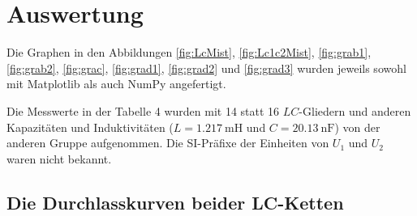 
\section{Auswertung}
\label{sec:Auswertung}
Die Graphen in den Abbildungen \ref{fig:LcMist}, \ref{fig:Lc1c2Mist}, \ref{fig:grab1},
 \ref{fig:grab2}, \ref{fig:grac}, \ref{fig:grad1}, \ref{fig:grad2} und \ref{fig:grad3}
  wurden jeweils sowohl mit Matplotlib \cite{matplotlib} als auch NumPy \cite{numpy} angefertigt.

Die Messwerte in der Tabelle 4 wurden mit 14 statt 16 $LC$-Gliedern und anderen
 Kapazitäten und Induktivitäten ($L = \SI{1.217}{\milli\henry}$ und $C = \SI{20.13}{\nano\farad}$) von der anderen Gruppe aufgenommen.
Die SI-Präfixe der Einheiten von $U_1$ und $U_2$ waren nicht bekannt.


\subsection{Die Durchlasskurven beider LC-Ketten}

